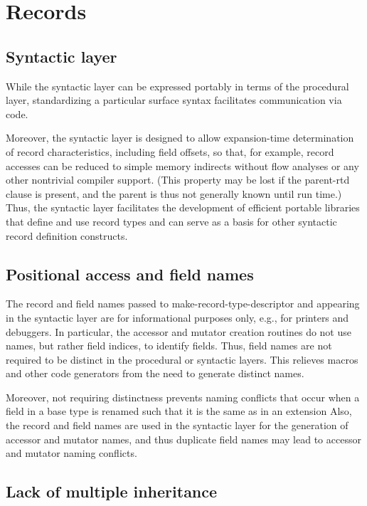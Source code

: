 \documentclass[twoside,twocolumn]{algol60}
\begin{document}
\chapter{Records}


\section{Syntactic layer}

While the syntactic layer can be expressed portably in terms of the
procedural layer, standardizing a particular surface syntax
facilitates communication via code.

Moreover, the syntactic layer is designed to allow expansion-time
determination of record characteristics, including field offsets, so that,
for example, record accesses can be reduced to simple memory indirects
without flow analyses or any other nontrivial compiler support. 
(This property may be lost if the {\cf parent-rtd} clause is present, and
the parent is thus not generally known until run time.)
Thus, the syntactic layer facilitates the development of efficient
portable libraries that define and use record types and can serve as a
basis for other syntactic record definition constructs. 

\section{Positional access and field names}

The record and field names passed to {\cf make-\hp{}record-\hp{}type-\hp{}descriptor}
and appearing in the syntactic layer are for informational purposes
only, e.g., for printers and debuggers.  In particular, the accessor
and mutator creation routines do not use names, but rather field
indices, to identify fields.
Thus, field names are not required to be distinct in the procedural or
syntactic layers.  This relieves macros and other code generators from
the need to generate distinct names.

Moreover, not requiring distinctness prevents naming conflicts that
occur when a field in a base type is renamed such that it is the same
as in an extension Also, the record and field names are used in the
syntactic layer for the generation of accessor and mutator names, and
thus duplicate field names may lead to accessor and mutator naming
conflicts.

\section{Lack of multiple inheritance}
\end{document}
